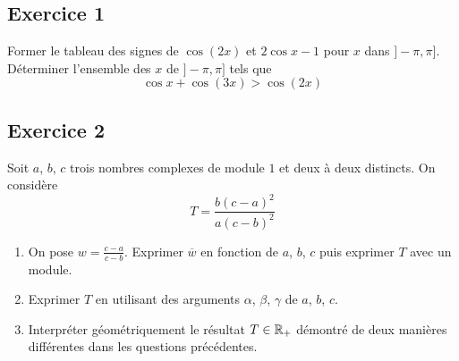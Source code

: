 \subsection*{Exercice 1}
Former le tableau des signes de $\cos(2x)$ et $2\cos x -1$ pour $x$ dans $]-\pi,\pi]$. Déterminer l'ensemble des $x$ de $]-\pi,\pi]$ tels que
\begin{displaymath}
 \cos x + \cos(3x) > \cos(2x)
\end{displaymath}

\subsection*{Exercice 2}
Soit $a$, $b$, $c$ trois nombres complexes de module $1$ et deux à deux distincts. On considère
\begin{displaymath}
 T = \frac{b(c-a)^2}{a(c-b)^2}
\end{displaymath}
\begin{enumerate}
 \item On pose $w = \frac{c-a}{c-b}$. Exprimer $\overline{w}$ en fonction de $a$, $b$, $c$ puis exprimer $T$ avec un module.
 \item Exprimer $T$ en utilisant des arguments $\alpha$, $\beta$, $\gamma$ de $a$, $b$, $c$.
 \item Interpréter géométriquement le résultat $T\in \mathbb{R}_+$ démontré de deux manières différentes dans les questions précédentes.
\end{enumerate}


